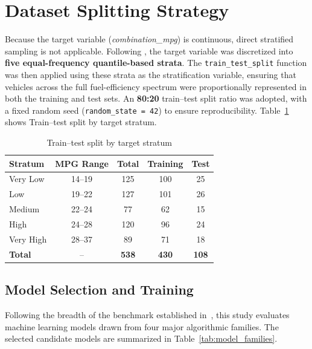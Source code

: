 \section{Dataset Splitting Strategy}

Because the target variable (\textit{combination\_mpg}) is continuous, direct stratified sampling is not applicable. Following \cite{atique2026explainable}, the target variable was discretized into \textbf{five equal-frequency quantile-based strata}. The \texttt{train\_test\_split} function was then applied using these strata as the stratification variable, ensuring that vehicles across the full fuel-efficiency spectrum were proportionally represented in both the training and test sets. An \textbf{80:20} train--test split ratio was adopted, with a fixed random seed (\texttt{random\_state = 42}) to ensure reproducibility. Table~\ref{tab:dataset_split} shows Train--test split by target stratum.\cite{atique2026explainable}

\begin{table}[H]
\centering
\begin{tabular}{|l|c|c|c|c|}
\hline
\textbf{Stratum} & \textbf{MPG Range} & \textbf{Total} & \textbf{Training} & \textbf{Test} \\
\hline
Very Low  & 14--19 & 125 & 100 & 25 \\
\hline
Low       & 19--22 & 127 & 101 & 26 \\
\hline
Medium    & 22--24 & 77  & 62  & 15 \\
\hline
High      & 24--28 & 120 & 96  & 24 \\
\hline
Very High & 28--37 & 89  & 71  & 18 \\
\hline
\textbf{Total} & -- & \textbf{538} & \textbf{430} & \textbf{108} \\
\hline
\end{tabular}
\caption{Train--test split by target stratum}
\label{tab:dataset_split}
\end{table}


\subsection{Model Selection and Training}

Following the breadth of the benchmark established in~\cite{atique2026explainable}, this study evaluates machine learning models drawn from four major algorithmic families. The selected candidate models are summarized in Table~\ref{tab:model_families}\cite{atique2026explainable}.

